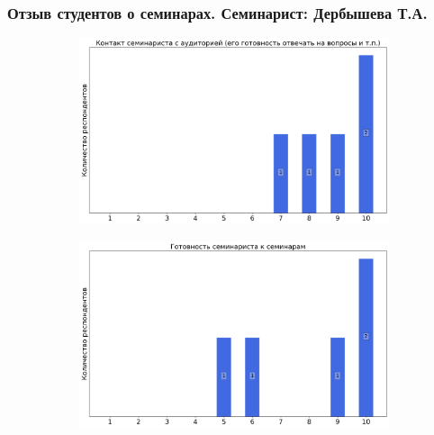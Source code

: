     \subsubsection{Отзыв студентов о семинарах. Семинарист: Дербышева Т.А.}
        \begin{figure}[H]
            \centering
            \begin{subfigure}[b]{0.45\textwidth}
                \centering
                \includegraphics[width=\textwidth]{images/1 course/Информатика/seminarists-marks-Дербышева Т.А.-0.png}
            \end{subfigure}
            \begin{subfigure}[b]{0.45\textwidth}
                \centering
                \includegraphics[width=\textwidth]{images/1 course/Информатика/seminarists-marks-Дербышева Т.А.-1.png}
            \end{subfigure}
            \begin{subfigure}[b]{0.45\textwidth}
                \centering

\end{subfigure}
\end{figure}
